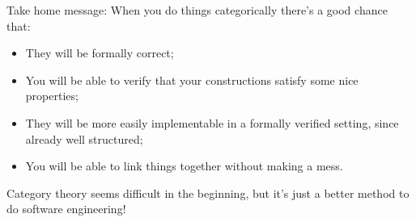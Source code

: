 \documentclass[xcolor={dvipsnames}]{beamer}
\begin{document}
\begin{frame}{Take home message:}
    \pause
  When you do things categorically there's a good chance that:
    \pause

  \bigskip
  \begin{itemize}
    \item They will be formally correct; 
      \pause
    \item You will be able to verify that your constructions satisfy some nice properties;  
      \pause
    \item They will be more easily implementable in a formally verified setting, since already well structured;
      \pause
    \item You will be able to link things together without making a mess.
      \pause
  \end{itemize}

  \bigskip
  Category theory seems difficult in the beginning, but it's just a better method to do software engineering!
\end{frame}
{
	\begin{frame}
	
	\end{frame}
}	
\end{document}

